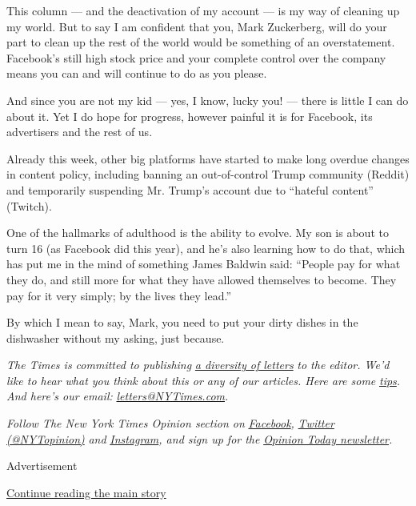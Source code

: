 This column --- and the deactivation of my account --- is my way of
cleaning up my world. But to say I am confident that you, Mark
Zuckerberg, will do your part to clean up the rest of the world would be
something of an overstatement. Facebook's still high stock price and
your complete control over the company means you can and will continue
to do as you please.

And since you are not my kid --- yes, I know, lucky you! --- there is
little I can do about it. Yet I do hope for progress, however painful it
is for Facebook, its advertisers and the rest of us.

Already this week, other big platforms have started to make long overdue
changes in content policy, including banning an out-of-control Trump
community (Reddit) and temporarily suspending Mr. Trump's account due to
``hateful content'' (Twitch).

One of the hallmarks of adulthood is the ability to evolve. My son is
about to turn 16 (as Facebook did this year), and he's also learning how
to do that, which has put me in the mind of something James Baldwin
said: ``People pay for what they do, and still more for what they have
allowed themselves to become. They pay for it very simply; by the lives
they lead.''

By which I mean to say, Mark, you need to put your dirty dishes in the
dishwasher without my asking, just because.

\emph{The Times is committed to publishing}
\href{https://www.nytimes3xbfgragh.onion/2019/01/31/opinion/letters/letters-to-editor-new-york-times-women.html}{\emph{a
diversity of letters}} \emph{to the editor. We'd like to hear what you
think about this or any of our articles. Here are some}
\href{https://help.nytimes3xbfgragh.onion/hc/en-us/articles/115014925288-How-to-submit-a-letter-to-the-editor}{\emph{tips}}\emph{.
And here's our email:}
\href{mailto:letters@NYTimes.com}{\emph{letters@NYTimes.com}}\emph{.}

\emph{Follow The New York Times Opinion section on}
\href{https://www.facebookcorewwwi.onion/nytopinion}{\emph{Facebook}}\emph{,}
\href{http://twitter.com/NYTOpinion}{\emph{Twitter (@NYTopinion)}}
\emph{and}
\href{https://www.instagram.com/nytopinion/}{\emph{Instagram}}\emph{,
and sign up for the}
\href{http://www.nytimes3xbfgragh.onion/newsletters/opiniontoday/}{\emph{Opinion
Today newsletter}}\emph{.}

Advertisement

\protect\hyperlink{after-bottom}{Continue reading the main story}

